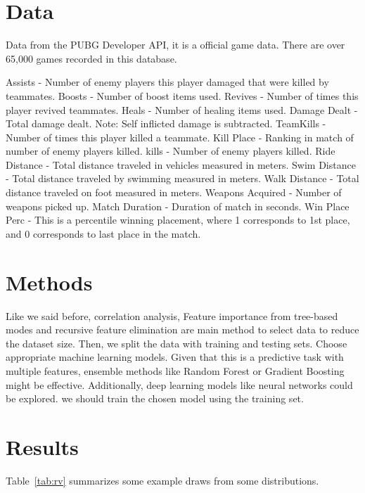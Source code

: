 \documentclass[12pt]{article}
\begin{document}
\section{Data}
\label{sec:data}

Data from the PUBG Developer API, it  is a official game data. There are over 65,000 games recorded in this database.  

Assists - 			Number of enemy players this player damaged that were killed by teammates.
Boosts -          		Number of boost items used.
Revives - 	     		Number of times this player revived teammates.
Heals - 	     		Number of healing items used.
Damage Dealt - 		Total damage dealt. Note: Self inflicted damage is subtracted.
TeamKills - 		Number of times this player killed a teammate.
Kill Place - 		Ranking in match of number of enemy players killed.
kills - 			Number of enemy players killed.
Ride Distance - 		Total distance traveled in vehicles measured in meters.
Swim Distance - 	Total distance traveled by swimming measured in meters.
Walk Distance - 	Total distance traveled on foot measured in meters.
Weapons Acquired - 	Number of weapons picked up.
Match Duration - 	Duration of match in seconds.
Win Place Perc -  	This is a percentile winning placement, where 1 corresponds to 1st place, and 0 corresponds to last place in the match.




\section{Methods}
\label{sec:meth}

Like we  said before,  correlation analysis, Feature importance from tree-based modes and recursive feature elimination are main method to select data to reduce the dataset size. Then, we split the data with training and testing sets. Choose appropriate machine learning models. Given that this is a predictive task with multiple features, ensemble methods like Random Forest or Gradient Boosting might be effective. Additionally, deep learning models like neural networks could be explored. we should train the chosen model using the training set.


\section{Results}
\label{sec:resu}

Table~\ref{tab:rv} summarizes some example draws from some distributions.
\lipsum[1-4]
\end{document}
